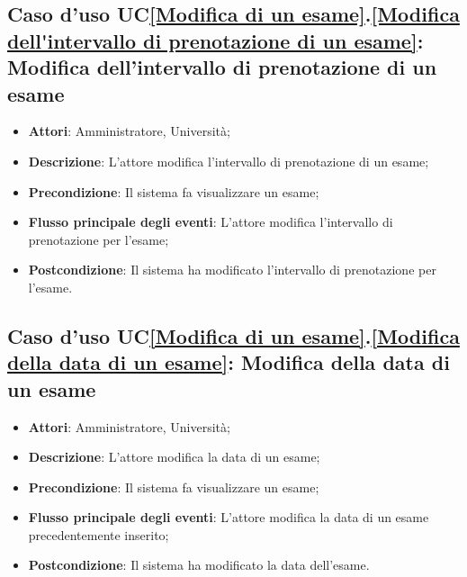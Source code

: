 \subsection{Caso d'uso UC\ref{Modifica di un esame}.\ref{Modifica dell'intervallo di prenotazione di un esame}: Modifica dell'intervallo di prenotazione di un esame}
\begin{itemize}
	\item \textbf{Attori}: Amministratore, Università;
	\item \textbf{Descrizione}: L'attore modifica l'intervallo di prenotazione di un esame;
	
	\item \textbf{Precondizione}: Il sistema fa visualizzare un esame;
	
	\item \textbf{Flusso principale degli eventi}: L'attore modifica l'intervallo di prenotazione per l'esame;
	
	\item \textbf{Postcondizione}: Il sistema ha modificato l'intervallo di prenotazione per l'esame.
	
\end{itemize}

\subsection{Caso d'uso UC\ref{Modifica di un esame}.\ref{Modifica della data di un esame}: Modifica della data di un esame}
\begin{itemize}
	\item \textbf{Attori}: Amministratore, Università;
	\item \textbf{Descrizione}: L'attore modifica la data di un esame;
	
	\item \textbf{Precondizione}: Il sistema fa visualizzare un esame;
	
	\item \textbf{Flusso principale degli eventi}: L'attore modifica la data di un esame precedentemente inserito;
	
	\item \textbf{Postcondizione}: Il sistema ha modificato la data dell'esame.
	
\end{itemize}


